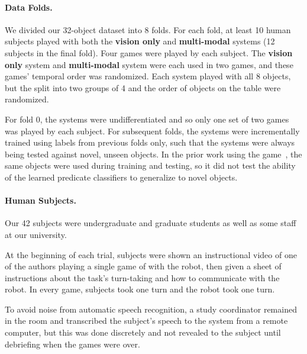 \paragraph{Data Folds.}
We divided our 32-object dataset into 8 folds.
For each fold, at least 10 human subjects played \ispy with both the \textbf{vision only} and \textbf{multi-modal} systems (12 subjects in the final fold).
Four games were played by each subject.
The \textbf{vision only} system and \textbf{multi-modal} system were each used in two games, and these games' temporal order was randomized.
Each system played with all 8 objects, but the split into two groups of 4 and the order of objects on the table were randomized.

For fold 0, the systems were undifferentiated and so only one set of two games was played by each subject. 
For subsequent folds, the systems were incrementally trained using labels from previous folds only, such that the systems were always being tested against novel, unseen objects.
In the prior work using the \ispy game~\cite{parde:ijcai15}, the same objects were used during training and testing, so it did not test the ability of the learned predicate classifiers to generalize to novel objects.

\paragraph{Human Subjects.}

Our 42 subjects were undergraduate and graduate students as well as some staff at our university.

At the beginning of each trial, subjects were shown an instructional video of one of the authors playing a single game of \ispy with the robot, then given a sheet of instructions about the task's turn-taking and how to communicate with the robot. 
In every game, subjects took one turn and the robot took one turn.

To avoid noise from automatic speech recognition, a study coordinator remained in the room and transcribed the subject's speech to the system from a remote computer, but this was done discretely and not revealed to the subject until debriefing when the games were over.
